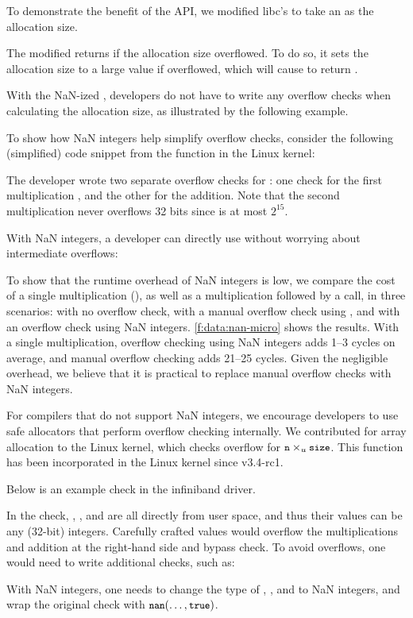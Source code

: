 To demonstrate the benefit of the API, we modified libc's 
to take an  as the allocation size.

The modified  returns  if the allocation size
overflowed.  To do so, it sets the allocation size to a large value
 if  overflowed, which will cause
 to return .

With the NaN-ized , developers do not have to write any overflow
checks when calculating the allocation size, as illustrated by the following
example.

%
To show how NaN integers help simplify overflow checks,
consider the following (simplified) code snippet from the
 function in the Linux kernel:
%

%
The developer wrote two separate overflow checks for
:
one check for the first multiplication , and
the other for the addition.
Note that the second multiplication 
never overflows 32 bits since  is at most $2^{15}$.

With NaN integers, a developer can directly use 
without worrying about intermediate overflows:
%

%
To show that the runtime overhead of NaN integers is low, we compare
the cost of a single multiplication (), as well as a multiplication
followed by a  call, in three scenarios: with no overflow
check, with a manual overflow check using
, and with an overflow check using
NaN integers.
%
\autoref{f:data:nan-micro} shows the results.
%
With a single multiplication, overflow checking using NaN integers
adds 1--3 cycles on average, and manual overflow checking adds
21--25 cycles.
%
Given the negligible overhead, we believe that it is practical
to replace manual overflow checks with NaN integers.

For compilers that do not support NaN integers, we encourage developers to use
safe allocators that perform overflow checking internally.  We contributed
 for array allocation to the Linux kernel, which
checks overflow for $\cc{n} \times_u \cc{size}$. This function has been
incorporated in the Linux kernel since v3.4-rc1.

Below is an example check in the infiniband driver.

In the check, , , and  are
all directly from user space, and thus their values can be any
(32-bit) integers.  Carefully crafted values would overflow the
multiplications and addition at the right-hand side and bypass
check.  To avoid overflows, one would need to write additional
checks, such as:

With NaN integers, one needs to change the type of
, , and  to NaN integers,
and wrap the original check with $\cc{nan}(\dots, \cc{true})$.

\fi

